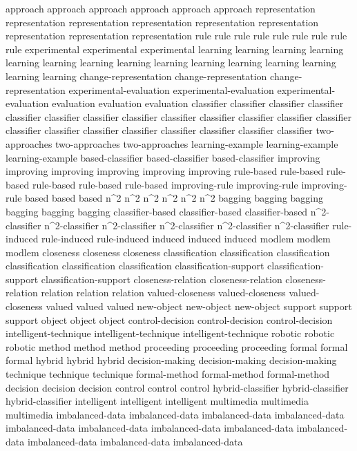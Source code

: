 approach	approach	approach	approach	approach	approach	
representation	representation	representation	representation	representation	representation	representation	representation	representation	
rule	rule	rule	rule	rule	rule	rule	rule	rule	
experimental	experimental	experimental	
learning	learning	learning	learning	learning	learning	learning	learning	learning	learning	learning	learning	learning	learning	learning	
change-representation	change-representation	change-representation	
experimental-evaluation	experimental-evaluation	experimental-evaluation	
evaluation	evaluation	evaluation	
classifier	classifier	classifier	classifier	classifier	classifier	classifier	classifier	classifier	classifier	classifier	classifier	classifier	classifier	classifier	classifier	classifier	classifier	classifier	classifier	classifier	
two-approaches	two-approaches	two-approaches	
learning-example	learning-example	learning-example	
based-classifier	based-classifier	based-classifier	
improving	improving	improving	improving	improving	improving	
rule-based	rule-based	rule-based	rule-based	rule-based	rule-based	
improving-rule	improving-rule	improving-rule	
based	based	based	
n^2	n^2	n^2	n^2	n^2	n^2	
bagging	bagging	bagging	bagging	bagging	bagging	
classifier-based	classifier-based	classifier-based	
n^2-classifier	n^2-classifier	n^2-classifier	n^2-classifier	n^2-classifier	n^2-classifier	
rule-induced	rule-induced	rule-induced	
induced	induced	induced	
modlem	modlem	modlem	
closeness	closeness	closeness	
classification	classification	classification	classification	classification	classification	
classification-support	classification-support	classification-support	
closeness-relation	closeness-relation	closeness-relation	
relation	relation	relation	
valued-closeness	valued-closeness	valued-closeness	
valued	valued	valued	
new-object	new-object	new-object	
support	support	support	
object	object	object	
control-decision	control-decision	control-decision	
intelligent-technique	intelligent-technique	intelligent-technique	
robotic	robotic	robotic	
method	method	method	
proceeding	proceeding	proceeding	
formal	formal	formal	
hybrid	hybrid	hybrid	
decision-making	decision-making	decision-making	
technique	technique	technique	
formal-method	formal-method	formal-method	
decision	decision	decision	
control	control	control	
hybrid-classifier	hybrid-classifier	hybrid-classifier	
intelligent	intelligent	intelligent	
multimedia	multimedia	multimedia	
imbalanced-data	imbalanced-data	imbalanced-data	imbalanced-data	imbalanced-data	imbalanced-data	imbalanced-data	imbalanced-data	imbalanced-data	imbalanced-data	imbalanced-data	imbalanced-data	
